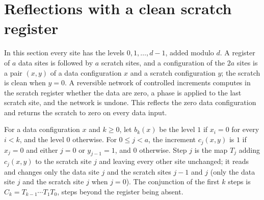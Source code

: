\section{Reflections with a clean scratch register}
\label{sec:zero_register}

In this section every site has the levels $0,1,\ldots,d-1$, added modulo $d$. A register of
$a$ data sites is followed by $a$ scratch sites, and a configuration of the $2a$ sites is a pair
$(x,y)$ of a data configuration $x$ and a scratch configuration $y$; the scratch is clean when
$y=0$. A reversible network of controlled increments computes in the scratch register whether
the data are zero, a phase is applied to the last scratch site, and the network is undone.
This reflects the zero data configuration and returns the scratch to zero on every data input.

\begin{definition}
    \label{def:zero_register_conjunction}
    \leanok
    For a data configuration $x$ and $k\geq0$, let $b_k(x)$ be the level $1$ if $x_i=0$ for
    every $i<k$, and the level $0$ otherwise. For $0\leq j<a$, the increment $c_j(x,y)$ is $1$
    if $x_j=0$ and either $j=0$ or $y_{j-1}=1$, and $0$ otherwise. Step $j$ is the map
    $T_j$ adding $c_j(x,y)$ to the scratch site $j$ and leaving every other site unchanged; it
    reads and changes only the data site $j$ and the scratch sites $j-1$ and $j$ (only the data
    site $j$ and the scratch site $j$ when $j=0$). The conjunction of the first $k$ steps is
    $C_k=T_{k-1}\cdots T_1T_0$, steps beyond the register being absent.
\end{definition}

